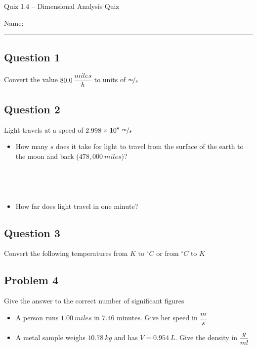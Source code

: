 \documentclass[11pt, letterpaper]{memoir}
\begin{document}
\begin{center}
	{\large	Quiz 1.4 -- Dimensional Analysis Quiz}
\end{center}
{\large Name: \rule[-1mm]{4in}{.1pt}
\subsection*{Question 1}
Convert the value $80.0~\dfrac{miles}{h}$ to units of $\nicefrac{m}{s}$

\vspace{3em}
\subsection*{Question 2}
Light travels at a speed of $2.998\times10^8~\nicefrac{m}{s}$
\begin{itemize}
	\item How many $s$ does it take for light to travel from the surface of the earth to the moon and back ($478,000~miles$)?

	      ~

	      ~

	\item How far does light travel in one minute?
\end{itemize}

\vspace{1em}
\subsection*{Question 3}
Convert the following temperatures from $K$ to $^\circ C$ or from $^\circ C$ to $K$


\vspace{3em}
\subsection*{Problem 4}
Give the answer to the correct number of significant figures
\begin{itemize}
	\item \vspace{2em} A person runs $1.00~miles$ in $7.46$ minutes. Give her speed in $\dfrac{m}{s}$
	\item \vspace{3em} A metal sample weighs $10.78~kg$ and has $V=0.954~L$. Give the density in $\dfrac{g}{ml}$
\end{itemize}

}
\end{document}
